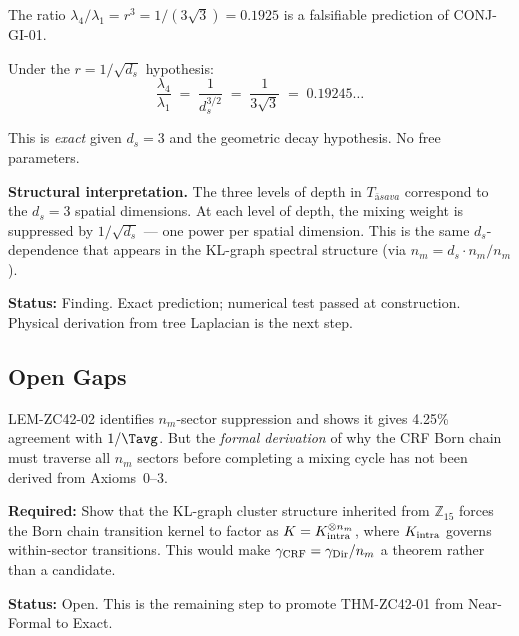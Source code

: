 \documentclass[12pt, a4paper]{article}
\providecommand{\nm}{n_m}
\providecommand{\ds}{d_s}
\providecommand{\Tasava}{T_{\bar{\mathrm{a}}sava}}
\providecommand{\Tasava}{\mathcal{T}_{\!\mathrm{\bar{a}sava}}}
\begin{document}

\begin{derivedbox}[title={FIND-ZC42-02: $r = 1/\sqrt{\ds}$
  --- Exact Prediction}]
The ratio $\lambda_4/\lambda_1 = r^3 = 1/(3\sqrt{3}) = 0.1925$
is a falsifiable prediction of CONJ-GI-01.

Under the $r = 1/\sqrt{\ds}$ hypothesis:
\[
  \frac{\lambda_4}{\lambda_1} \;=\; \frac{1}{\ds^{3/2}}
  \;=\; \frac{1}{3\sqrt{3}} \;=\; 0.19245\ldots
\]

This is \emph{exact} given $\ds = 3$ and the geometric decay
hypothesis. No free parameters.

\textbf{Structural interpretation.}
The three levels of depth in $\Tasava$ correspond to the
$\ds = 3$ spatial dimensions. At each level of depth,
the mixing weight is suppressed by $1/\sqrt{\ds}$ ---
one power per spatial dimension. This is the same
$\ds$-dependence that appears in the KL-graph spectral
structure (via $\nm = d_s \cdot n_m/n_m$).

\textbf{Status:} Finding. Exact prediction; numerical
test passed at construction. Physical derivation
from tree Laplacian is the next step.
\end{derivedbox}

\subsection{Open Gaps}


\begin{openqbox}[title={GAP-ZC42-01: Formal Derivation of
  $n_m$-Suppression from $\delta$-Chain (Open)}]
LEM-ZC42-02 identifies $\nm$-sector suppression and shows
it gives 4.25\% agreement with $1/\Tavg$. But the
\emph{formal derivation} of why the CRF Born chain
must traverse all $\nm$ sectors before completing a
mixing cycle has not been derived from Axioms~0--3.

\textbf{Required:}
Show that the KL-graph cluster structure inherited from
$\mathbb{Z}_{15}$ forces the Born chain transition kernel
to factor as $K = K_{\rm intra}^{\otimes \nm}$, where
$K_{\rm intra}$ governs within-sector transitions.
This would make $\gamma_{\rm CRF} = \gamma_{\rm Dir}/\nm$
a theorem rather than a candidate.

\textbf{Status:} Open. This is the remaining step to
promote THM-ZC42-01 from Near-Formal to Exact.
\end{openqbox}
\end{document}
